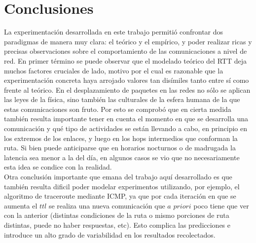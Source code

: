 \section{Conclusiones}

La experimentación desarrollada en este trabajo permitió confrontar dos paradigmas de manera muy clara: el teórico y el empírico, y poder realizar ricas y precisas observaciones sobre el comportamiento de las comunicaciones a nivel de red. En primer término se puede observar que el modelado teórico del RTT deja muchos factores cruciales de lado, motivo por el cual es razonable que la experimentación concreta haya arrojado valores tan disímiles tanto entre sí como frente al teórico. En el desplazamiento de paquetes en las redes no sólo se aplican las leyes de la física, sino también las culturales de la esfera humana de la que estas comunicaciones son fruto. Por esto se comprobó que en cierta medida también resulta importante tener en cuenta el momento en que se desarrolla una comunicación y qué tipo de actividades se están llevando a cabo, en principio en los extremos de los enlaces, y luego en los hops intermedios que conforman la ruta. Si bien puede anticiparse que en horarios nocturnos o de madrugada la latencia sea menor a la del día, en algunos casos se vio que no necesariamente esta idea se condice con la realidad.\\
\indent Otra conclusión importante que emana del trabajo aquí desarrollado es que también resulta dificil poder modelar experimentos utilizando, por ejemplo, el algoritmo de traceroute mediante ICMP, ya que por cada iteración en que se aumenta el $ttl$ se realiza una nueva comunicación que $a$ $priori$ poco tiene que ver con la anterior (distintas condiciones de la ruta o mismo porciones de ruta distintas, puede no haber respuestas, etc). Esto complica las predicciones e introduce un alto grado de variabilidad en los resultados recolectados.
